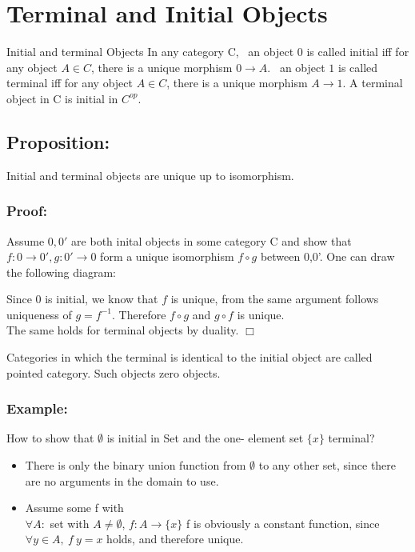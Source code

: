\section {Terminal and Initial Objects}
\begin {definition}{Initial and terminal Objects}
  In any category C,
  \ an object $0$ is called initial iff for any object $A \in C$, there is a unique morphism $0 \to A$.
  \ an object $1$ is called terminal iff for any object $A \in C$, there is a unique morphism $A \to 1$. A terminal object in C is initial in $C^{op}$.

\end {definition}

\subsection {Proposition:}
   Initial and terminal objects are unique up to isomorphism.

\subsubsection {Proof:}
   Assume $0, 0'$ are both inital objects in some category C and show that $f: 0 \to 0', g: 0' \to 0$ form a unique isomorphism $f \circ g$ between 0,0'. One can draw the following diagram:
  
 

  Since $0$ is initial, we know that $f$ is unique, from the same argument follows uniqueness of $g = f^{-1}$. Therefore $f \circ g$ and $g \circ f$ is unique.    
    \\ The same holds for terminal objects by duality. $\Box$

        Categories in which the terminal is identical to the initial object are called pointed category. Such objects zero objects.

    \subsubsection {Example:}
    How to show that $\emptyset$ is initial in Set and the one- element set $\{x\}$ terminal?

    \begin {itemize}
    \item There is only the binary union function from $\emptyset$ to any other set, since there are no arguments in the domain to use.
    \item Assume some f with
      \\ $\forall A:$ set with $A \neq \emptyset$, $ f: A \to \{x\}$
      f is obviously a constant function, since $\forall y \in A,\ f \ y = x$ holds, and therefore unique.
		\end{itemize}


